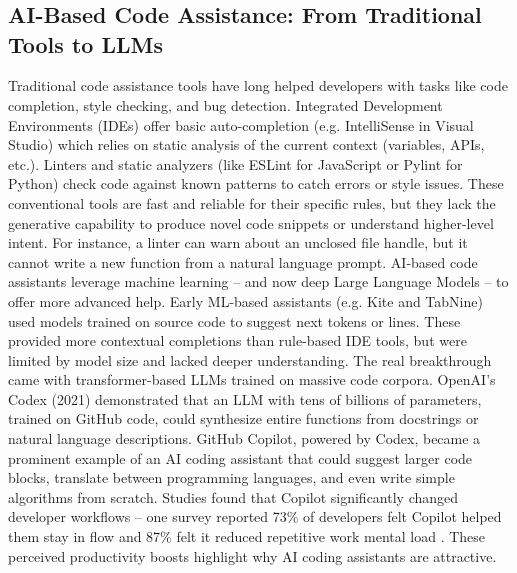 \chapter{}%
\label{ch:stand-van-zaken}



\section{AI-Based Code Assistance: From Traditional Tools to LLMs}
\label{sec:ai-based-code-assistance}
Traditional code assistance tools have long helped developers with tasks like code completion, style checking, and bug detection. Integrated Development Environments (IDEs) offer basic auto-completion (e.g. IntelliSense in Visual Studio) which relies on static analysis of the current context (variables, APIs, etc.). Linters and static analyzers (like ESLint for JavaScript or Pylint for Python) check code against known patterns to catch errors or style issues. These conventional tools are fast and reliable for their specific rules, but they lack the generative capability to produce novel code snippets or understand higher-level intent. For instance, a linter can warn about an unclosed file handle, but it cannot write a new function from a natural language prompt.
AI-based code assistants leverage machine learning – and now deep Large Language Models – to offer more advanced help. Early ML-based assistants (e.g. Kite and TabNine) used models trained on source code to suggest next tokens or lines. These provided more contextual completions than rule-based IDE tools, but were limited by model size and lacked deeper understanding. The real breakthrough came with transformer-based LLMs trained on massive code corpora. OpenAI’s Codex (2021) demonstrated that an LLM with tens of billions of parameters, trained on GitHub code, could synthesize entire functions from docstrings or natural language descriptions​. GitHub Copilot, powered by Codex, became a prominent example of an AI coding assistant that could suggest larger code blocks, translate between programming languages, and even write simple algorithms from scratch. Studies found that Copilot significantly changed developer workflows – one survey reported 73\% of developers felt Copilot helped them stay in flow and 87\% felt it reduced repetitive work mental load \autocite{GitHub2022}. These perceived productivity boosts highlight why AI coding assistants are attractive.
